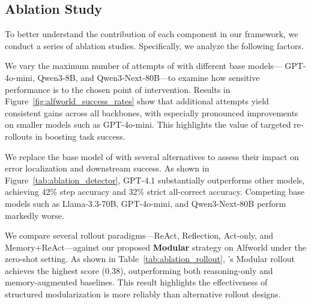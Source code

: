 \subsection{Ablation Study}





To better understand the contribution of each component in our framework, we conduct a series of ablation studies. Specifically, we analyze the following factors.

We vary the maximum number of attempts of \ModelName{} with different base models— GPT-4o-mini, Qwen3-8B, and Qwen3-Next-80B—to examine how sensitive performance is to the chosen point of intervention. Results in Figure~\ref{fig:alfworld_success_rates} show that additional attempts yield consistent gains across all backbones, with especially pronounced improvements on smaller models such as GPT-4o-mini. This highlights the value of targeted re-rollouts in boosting task success.

We replace the base model of \ModelName{} with several alternatives to assess their impact on error localization and downstream success. As shown in Figure~\ref{tab:ablation_detector}, GPT-4.1 substantially outperforms other models, achieving 42\% step accuracy and 32\% strict all-correct accuracy. Competing base models such as Llama-3.3-70B, GPT-4o-mini, and Qwen3-Next-80B perform markedly worse.

We compare several rollout paradigms—ReAct, Reflection, Act-only, and Memory+ReAct—against our proposed \textbf{Modular} strategy on Alfworld under the zero-shot setting. As shown in Table~\ref{tab:ablation_rollout}, \ModelName{}’s Modular rollout achieves the highest score (0.38), outperforming both reasoning-only and memory-augmented baselines. This result highlights the effectiveness of structured modularization is more reliably than alternative rollout designs.


